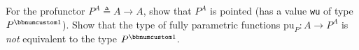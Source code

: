 For the profunctor $P^{A}\triangleq A\rightarrow A$, show that $P^{A}$
is pointed (has a value \lstinline!wu! of type $P^{\bbnum 1}$).
Show that the type of fully parametric functions $\text{pu}_{P}:A\rightarrow P^{A}$
is \emph{not} equivalent to the type $P^{\bbnum 1}$.

\begin{comment}
this is chapter eight devoted to applicative hunters and pro functors
the first part will be practical examples main motivation for applicati
factors comes from considering kinetic computations or computations
in the factor block as I color in case when effects are independent
and competitive or in case when these effects could be executed in
parallel while the result is still correct here is an example consider
a portion of a functor block or a for yield block in Scala that looks
like this there are three future values and X will be waiting until
with this future value is ready imagine that these are some long-running
computations and after these three lines we can use XYZ and further
computations any further computations will be waiting for these three
futures now if we write code like this then these three futures will
be created sequentially that is first this future will be created
and scheduled on some thread and then when it\textsf{'}s done you get the value
X and then this second future will be created and scheduled even though
it doesn't use the value X but the monadic block or the for yield
block or the Thunder block whatever you want to call it I call it
a factor block the Thunder block is such that every generator line
locks everything else until it\textsf{'}s done so in the future we'll be created
one at a time and so obviously this is not optimal if you translate
this into flat map code and map that\textsf{'}s the code so you have a first
future but to which you append this flat map so you schedule it is
further computation only when the first computation is ready the second
future will be then started and this will be waiting until the second
future is ready and then the third future will be started and this
will be ready will be waiting until the third future is ready clearly
this is not optimal would like to parallelize these things and we
have seen in a previous tutorial that a very easy way of paralyzing
such computations is to create the futures before starting the factor
block but this is actually a specific feature of scholar where futures
already start computing when you create them there is no separate
method to start computing them which is actually a design flaw and

\end{comment}
